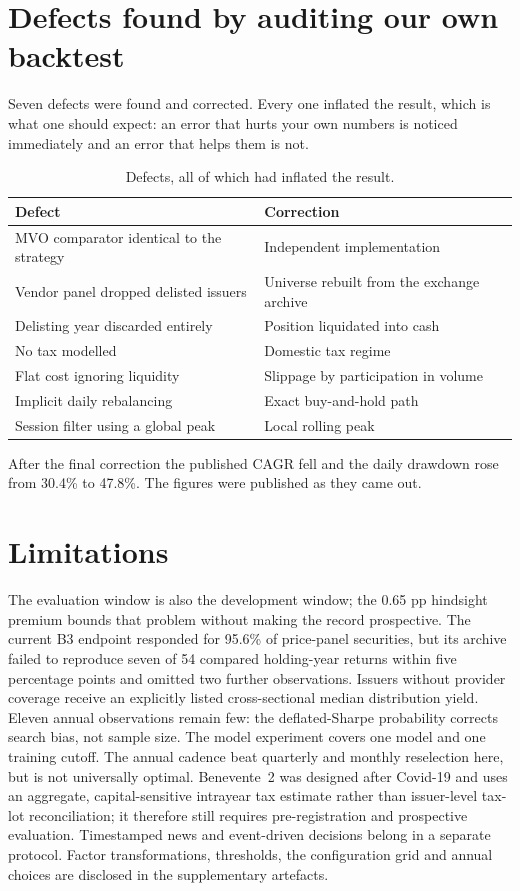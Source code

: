 \documentclass[10pt,conference]{IEEEtran}
\begin{document}
\section{Defects found by auditing our own backtest}

Seven defects were found and corrected. Every one inflated the result, which is what one should expect: an error that hurts your own numbers is noticed immediately and an error that helps them is not.

\begin{table}[t]
\caption{Defects, all of which had inflated the result.}
\centering
\footnotesize
\begin{tabular}{p{3.1cm}p{4.1cm}}
\toprule
Defect & Correction \\
\midrule
MVO comparator identical to the strategy & Independent implementation \\
Vendor panel dropped delisted issuers & Universe rebuilt from the exchange archive \\
Delisting year discarded entirely & Position liquidated into cash \\
No tax modelled & Domestic tax regime \\
Flat cost ignoring liquidity & Slippage by participation in volume \\
Implicit daily rebalancing & Exact buy-and-hold path \\
Session filter using a global peak & Local rolling peak \\
\bottomrule
\end{tabular}
\label{tab:defects}
\end{table}

After the final correction the published CAGR fell and the daily drawdown rose from 30.4\% to 47.8\%. The figures were published as they came out.

\section{Limitations}

The evaluation window is also the development window; the 0.65 pp hindsight premium bounds that problem without making the record prospective. The current B3 endpoint responded for 95.6\% of price-panel securities, but its archive failed to reproduce seven of 54 compared holding-year returns within five percentage points and omitted two further observations. Issuers without provider coverage receive an explicitly listed cross-sectional median distribution yield. Eleven annual observations remain few: the deflated-Sharpe probability corrects search bias, not sample size. The model experiment covers one model and one training cutoff. The annual cadence beat quarterly and monthly reselection here, but is not universally optimal. Benevente~2 was designed after Covid-19 and uses an aggregate, capital-sensitive intrayear tax estimate rather than issuer-level tax-lot reconciliation; it therefore still requires pre-registration and prospective evaluation. Timestamped news and event-driven decisions belong in a separate protocol. Factor transformations, thresholds, the configuration grid and annual choices are disclosed in the supplementary artefacts.
\end{document}
